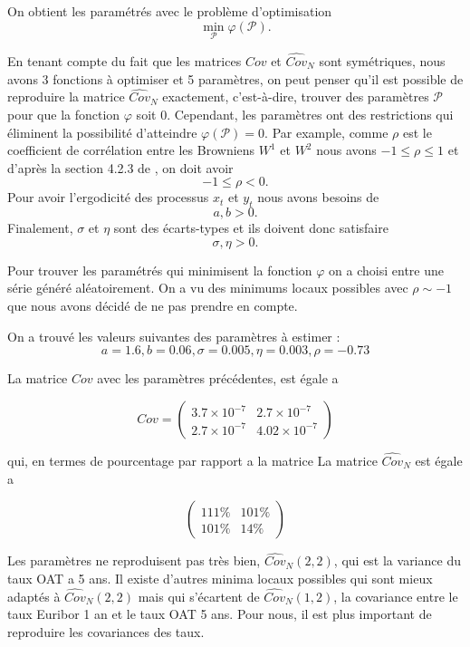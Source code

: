 \documentclass[12pt, a4paper]{book}
\begin{document}
On obtient les paramétrés avec le problème d'optimisation 
$$\min_{\mathcal{P}}\varphi(\mathcal{P}).$$

En tenant compte du fait que les matrices $Cov$ et $\widehat{Cov}_N$ sont symétriques, nous avons 3 fonctions à optimiser et 5 paramètres, on peut penser qu'il est possible de reproduire la matrice $\widehat{Cov}_N$ exactement, c'est-à-dire, trouver des paramètres $\mathcal{P}$ pour que la fonction $\varphi$ soit $0$. Cependant, les paramètres ont des restrictions qui éliminent la possibilité d'atteindre $\varphi(\mathcal{P}) = 0$. Par example, comme $\rho$ est le coefficient de corrélation entre les Browniens $W^1$ et $W^2$ nous avons $-1 \leq \rho \leq 1$ et d'après la section 4.2.3 de \cite{BM}, on doit avoir
$$-1\leq \rho < 0.$$
Pour avoir l'ergodicité des processus $x_t$ et $y_t$ nous avons besoins de
$$ a, b >0.$$
Finalement, $\sigma$ et $\eta$ sont des écarts-types et ils doivent donc satisfaire
$$ \sigma, \eta > 0.$$

Pour trouver les paramétrés qui minimisent la fonction $\varphi$ on a choisi entre une série généré aléatoirement. On a vu des minimums locaux possibles avec $\rho \sim -1$ que nous avons décidé de ne pas prendre en compte.

On a trouvé les valeurs suivantes des paramètres à estimer :
$$a = 1.6, b=0.06, \sigma=0.005, \eta=0.003, \rho=-0.73$$

La matrice $Cov$ avec les paramètres précédentes, est égale a

$$
Cov = \left(
\begin{array}{cc}
3.7 \times 10^{-7} & 2.7 \times 10^{-7}\\
2.7 \times 10^{-7} & 4.02 \times 10^{-7}
\end{array}
\right)
$$

qui, en termes de pourcentage par rapport a la matrice La matrice $\widehat{Cov}_N$ est égale a 

$$
\left(
\begin{array}{cc}
111\% & 101\%\\
101\% & 14\%
\end{array}
\right)
$$

Les paramètres ne reproduisent pas très bien, $\widehat{Cov}_N(2,2)$, qui est la variance du taux OAT a 5 ans. Il existe d'autres minima locaux possibles qui sont mieux adaptés à $\widehat{Cov}_N(2,2)$  mais qui s'écartent de $\widehat{Cov}_N(1,2)$, la covariance entre le taux Euribor 1 an et le taux OAT 5 ans. Pour nous, il est plus important de reproduire les covariances des taux. 
\end{document}
